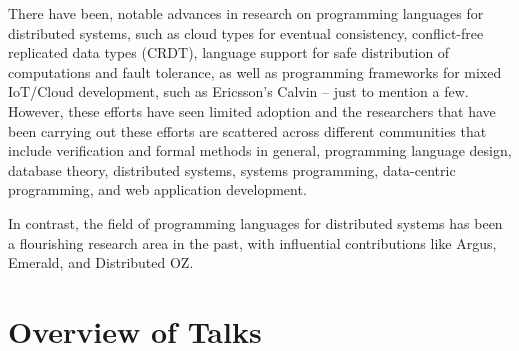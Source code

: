 \documentclass[a4paper]{article}
\begin{document}
There have been, notable advances in research on programming languages for distributed systems, such as cloud types for eventual consistency, conflict-free replicated data types (CRDT), language support for safe distribution of computations and fault tolerance, as well as programming frameworks for mixed IoT/Cloud development, such as Ericsson’s Calvin -- just to mention a few. However, these efforts have seen limited adoption and the researchers that have been carrying out these efforts are scattered across different communities that include verification and formal methods in general, programming language design, database theory, distributed systems, systems programming, data-centric programming, and web application development.

In contrast, the field of programming languages for distributed systems has been a flourishing research area in the past, with influential contributions like Argus, Emerald, and Distributed OZ.

\clearpage


\section*{Overview of Talks}











\end{document}
